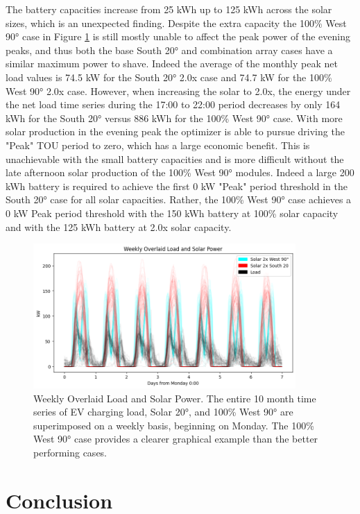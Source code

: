 \documentclass[journal,article,submit,pdftex,moreauthors]{Definitions/mdpi}
\begin{document}
The battery capacities increase from 25 kWh up to 125 kWh across the
solar sizes, which is an unexpected finding. Despite the extra capacity
the 100\% West 90° case in Figure \ref{fig:weekly-load-solar} is still mostly unable to affect the
peak power of the evening peaks, and thus both the base South 20° and
combination array cases have a similar maximum power to shave. Indeed
the average of the monthly peak net load values is 74.5 kW for the South
20° 2.0x case and 74.7 kW for the 100\% West 90° 2.0x case. However,
when increasing the solar to 2.0x, the energy under the net load time
series during the 17:00 to 22:00 period decreases by only 164 kWh for
the South 20° versus 886 kWh for the 100\% West 90° case. With more
solar production in the evening peak the optimizer is able to pursue
driving the "Peak" TOU period to zero, which has a large economic
benefit. This is unachievable with the small battery capacities and is
more difficult without the late afternoon solar production of the 100\%
West 90° modules. Indeed a large 200 kWh battery is required to achieve
the first 0 kW "Peak" period threshold in the South 20° case for all
solar capacities. Rather, the 100\% West 90° case achieves a 0 kW Peak
period threshold with the 150 kWh battery at 100\% solar capacity and
with the 125 kWh battery at 2.0x solar capacity.

\begin{figure}
  \centering
  \includegraphics[width=10cm]{./images/bifacial_peak_shaving_paper.assets/weekly load solar.png}
  \caption{Weekly Overlaid Load and Solar Power. The
  entire 10 month time series of EV charging load, Solar 20°, and 100\%
  West 90° are superimposed on a weekly basis, beginning on Monday. The
  100\% West 90° case provides a clearer graphical example than the better
  performing cases.}
  \label{fig:weekly-load-solar}
\end{figure}

\section{Conclusion}\label{conclusion}%
\end{document}
